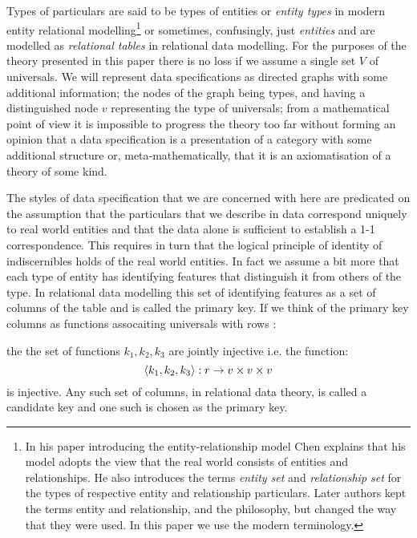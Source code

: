 \documentclass[10pt,a4paper]{article}
\newcommand{\veee}{v}
\newcommand{\Veee}{V}
\begin{document}
Types of particulars are said to be 
types of entities or \textit{entity types} in modern entity relational modelling\footnote{In  his paper  introducing the entity-relationship model Chen explains that his model adopts the view that the real world consists of entities and relationships. He also introduces the  terms \textit{entity set} and \textit{relationship set} for the types of respective entity and relationship particulars. Later authors kept the terms entity and relationship, and the philosophy, but changed the way that they were used. In this paper we use the modern terminology.} or sometimes, confusingly, just \textit{entities}  and 
are modelled as \textit{relational tables} in relational data modelling. For the purposes of the theory presented in this paper there is no loss if we assume a single set $\Veee$ of universals.  We will represent data specifications as directed graphs with 
some additional information; the nodes of the graph being types, and having a distinguished node $\veee$ representing the type of universals; from a mathematical point of view it is impossible to progress the theory too far without forming an opinion that a data specification is a presentation of a category with some additional structure or, meta-mathematically, that it is an axiomatisation of a theory of some kind. 

The styles of data specification that we are concerned with here are predicated on the assumption that the particulars that we describe in data correspond uniquely to real world entities and that the data 
alone is sufficient to establish a 1-1 correspondence. This requires in turn that the logical 
principle of identity of indiscernibles holds of the real world entities. In fact we assume a bit more 
that each type of entity has identifying features that distinguish it from  others of the type. 
In relational data modelling this set of identifying features as a set of columns of the table and is called the primary key.  If we think of the primary key columns as functions assocaiting universals
with rows :

the the set of functions $k_1,k_2,k_3$ are jointly injective i.e. the function:
$$
\tuple{k_1,k_2,k_3}: r \morph \veee \times \veee \times \veee
$$
is injective. Any such set of columns, in relational data theory, is called a candidate key and 
one such is chosen as the primary key. 
\end{document}
